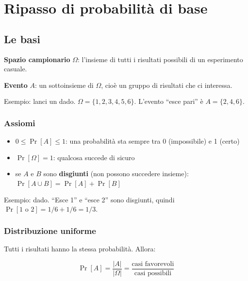 \chapter{Ripasso di probabilità di base}

\section{Le basi}

\textbf{Spazio campionario} \(\Omega\): l'insieme di tutti i risultati possibili di un esperimento casuale.

\textbf{Evento} \(A\): un sottoinsieme di \(\Omega\), cioè un gruppo di risultati che ci interessa.

\begin{esempio}

Esempio: lanci un dado. \(\Omega = \{1,2,3,4,5,6\}\). L'evento ``esce pari'' è \(A = \{2,4,6\}\).

\end{esempio}

\subsection{Assiomi}

\begin{itemize}
\tightlist
\item
  \(0 \le \Pr[A] \le 1\): una probabilità sta sempre tra 0 (impossibile) e 1 (certo)
\item
  \(\Pr[\Omega] = 1\): qualcosa succede di sicuro
\item
  se \(A\) e \(B\) sono \textbf{disgiunti} (non possono succedere insieme): \(\Pr[A \cup B] = \Pr[A] + \Pr[B]\)
\end{itemize}

\begin{esempio}

Esempio: dado. ``Esce 1'' e ``esce 2'' sono disgiunti, quindi \(\Pr[\text{1 o 2}] = 1/6 + 1/6 = 1/3\).

\end{esempio}

\subsection{Distribuzione uniforme}

Tutti i risultati hanno la stessa probabilità. Allora:

\[
\Pr[A] = \frac{|A|}{|\Omega|} = \frac{\text{casi favorevoli}}{\text{casi possibili}}
\]

